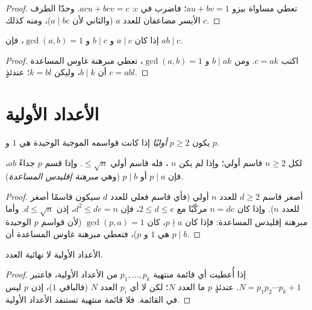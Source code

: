\begin{proof}
تعطي مساواة بيزو $au + bv = 1$؛ فاضرب في $c$: $acu + bcv = c$. وحدّا
الطرف الأيسر مضاعفان للعدد $a$ (والثاني لأن $a \mid bc$)، ومنه
كذلك $c$.
\end{proof}

\begin{corollary}\label{cor:g12:arith:coprimeprod}
إذا كان $a \mid c$ و $b \mid c$ و $\gcd(a,b) = 1$، فإن $ab \mid c$.
\end{corollary}

\begin{proof}
اكتب $c = ak$. ومن $b \mid ak$ و $\gcd(a,b)=1$، تعطي مبرهنة غاوس المساعدة
أن $b \mid k$، وليكن $k = bl$؛ عندئذٍ $c = abl$.
\end{proof}

\section{الأعداد الأولية}

\begin{definition}\label{def:g12:arith:prime}
يكون  $p \geq 2$ \emph{أوليًا} إذا كانت قواسمه
الموجبة الوحيدة هي $1$ و $p$.
\end{definition}

\begin{proposition}\label{prop:g12:arith:primedivides}
لكل  $n \geq 2$ قاسم أولي؛ وإذا لم يكن $n$ ، فله
قاسم أولي $\leq \sqrt n$. وإذا قسم  $p$ جداءً $ab$، فإن
$p \mid a$ أو $p \mid b$ (وهي \emph{مبرهنة إقليدس المساعدة}).
\end{proposition}

\begin{proof}
أصغر قاسم $d \geq 2$ للعدد $n$ أولي (فأي قاسم فعلي للعدد $d$
سيكون قاسمًا أصغر للعدد $n$). وإذا كان $n = de$ مركّبًا مع
$2 \leq d \leq e$، فإن $d^2 \leq de = n$، إذن $d \leq \sqrt n$. وأما مبرهنة إقليدس
المساعدة: فإذا كان $p \nmid a$، كان $\gcd(p, a) = 1$ (لأن قواسم $p$ الوحيدة هي
$1$ و $p$)، فتعطي مبرهنة غاوس المساعدة أن $p \mid b$.
\end{proof}

\begin{theorem}[إقليدس]\label{thm:g12:arith:infiniteprimes}
الأعداد الأولية لا نهائية العدد.
\end{theorem}

\begin{proof}
إذا أُعطيت أي قائمة منتهية $p_1, \dots, p_k$ من الأعداد الأولية، فاعتبر
$N = p_1 p_2 \cdots p_k + 1$. عندئذٍ   $p$ ما العدد $N$؛ لكن لا  أي $p_i$
العدد $N$ (فالباقي $1$)، إذن $p$  ليس في القائمة. فلا
قائمة منتهية تستنفد الأعداد الأولية.
\end{proof}

